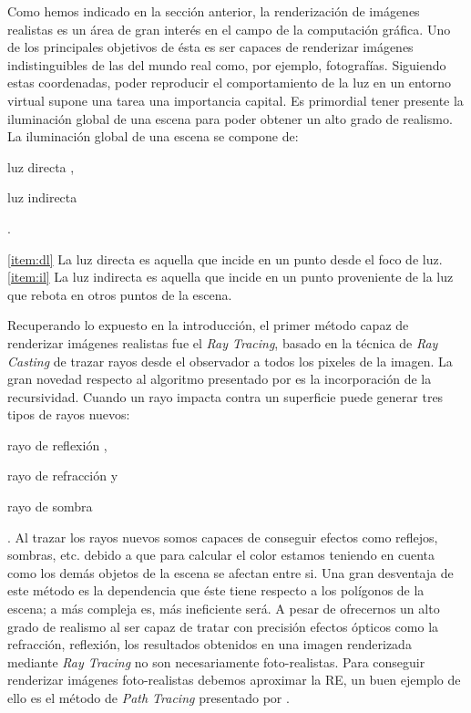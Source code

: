\documentclass[titlepage,12pt]{report}
\begin{document}
Como hemos indicado en la sección anterior, la renderización de imágenes realistas es un área de gran interés en el campo de la computación gráfica. Uno de los principales objetivos de ésta es ser capaces de renderizar imágenes indistinguibles de las del mundo real como, por ejemplo, fotografías. Siguiendo estas coordenadas, poder reproducir el comportamiento de la luz en un entorno virtual supone una tarea una importancia capital. Es primordial tener presente la iluminación global de una escena para poder obtener un alto grado de realismo. La iluminación global de una escena se compone de: \begin{enumerate*}[label=\roman*)] \item luz directa \label{item:dl}, \item luz indirecta \label{item:il} \end{enumerate*}.

\ref{item:dl} La luz directa es aquella que incide en un punto desde el foco de luz. \\
\ref{item:il} La luz indirecta es aquella que incide en un punto proveniente de la luz que rebota en otros puntos de la escena.

Recuperando lo expuesto en la introducción, el primer método capaz de renderizar imágenes realistas fue el \textit{Ray Tracing}, basado en la técnica de \textit{Ray Casting} de trazar rayos desde el observador a todos los pixeles de la imagen. La gran novedad respecto al algoritmo presentado por \citep{Appel1968} es la incorporación de la recursividad. Cuando un rayo impacta contra un superficie puede generar tres tipos de rayos nuevos: \begin{enumerate*}[label=\roman*)] \item rayo de reflexión \label{ray:reflected}, \item rayo de refracción y \item rayo de sombra \end{enumerate*}. Al trazar los rayos nuevos somos capaces de conseguir efectos como reflejos, sombras, etc. debido a que para calcular el color estamos teniendo en cuenta como los demás objetos de la escena se afectan entre si. Una gran desventaja de este método es la dependencia que éste tiene respecto a los polígonos de la escena; a más compleja es, más ineficiente será. A pesar de ofrecernos un alto grado de realismo al ser capaz de tratar con precisión efectos ópticos como la refracción, reflexión, los resultados obtenidos en una imagen renderizada mediante \textit{Ray Tracing} no son necesariamente foto-realistas. Para conseguir renderizar imágenes foto-realistas debemos aproximar la RE, un buen ejemplo de ello es el método de \textit{Path Tracing} presentado por \citep{Kajiya1986}.
\end{document}
